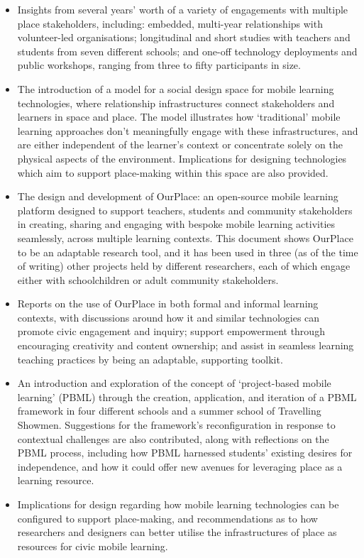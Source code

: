\begin{itemize}
    \item Insights from several years' worth of a variety of engagements with multiple place stakeholders, including: embedded, multi-year relationships with volunteer-led organisations; longitudinal and short studies with teachers and students from seven different schools; and one-off technology deployments and public workshops, ranging from three to fifty participants in size.
    \item The introduction of a model for a social design space for mobile learning technologies, where relationship infrastructures connect stakeholders and learners in space and place. The model illustrates how `traditional' mobile learning approaches don’t meaningfully engage with these infrastructures, and are either independent of the learner’s context or concentrate solely on the physical aspects of the environment. Implications for designing technologies which aim to support place-making within this space are also provided.
    \item The design and development of OurPlace: an open-source mobile learning platform designed to support teachers, students and community stakeholders in creating, sharing and engaging with bespoke mobile learning activities seamlessly, across multiple learning contexts. This document shows OurPlace to be an adaptable research tool, and it has been used in three (as of the time of writing) other projects held by different researchers, each of which engage either with schoolchildren or adult community stakeholders.
    \item Reports on the use of OurPlace in both formal and informal learning contexts, with discussions around how it and similar technologies can promote civic engagement and inquiry; support empowerment through encouraging creativity and content ownership; and assist in seamless learning teaching practices by being an adaptable, supporting toolkit.
    \item An introduction and exploration of the concept of `project-based mobile learning' (PBML) through the creation, application, and iteration of a PBML framework in four different schools and a summer school of Travelling Showmen. Suggestions for the framework's reconfiguration in response to contextual challenges are also contributed, along with reflections on the PBML process, including how PBML harnessed students’ existing desires for independence, and how it could offer new avenues for leveraging place as a learning resource.
    \item Implications for design regarding how mobile learning technologies can be configured to support place-making, and recommendations as to how researchers and designers can better utilise the infrastructures of place as resources for civic mobile learning.

\end{itemize}
